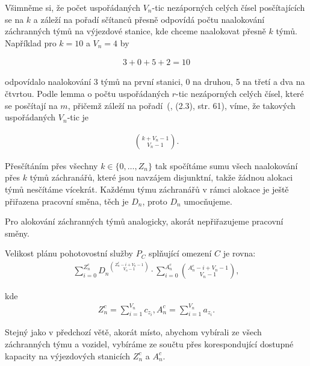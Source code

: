 \begin{dukaz}
  Všimněme si, že počet uspořádaných $V_n$-tic nezáporných celých čísel posčítajících se na $k$
  a záleží na pořadí sčítanců přesně odpovídá počtu naalokování záchranných týmů na výjezdové stanice, kde chceme naalokovat přesně $k$ týmů.
  Například pro $k = 10$ a $V_n = 4$ by

  \begin{align*}
    3 + 0 + 5 + 2 = 10
  \end{align*}

  odpovídalo naalokování 3 týmů na první stanici, 0 na druhou, 5 na třetí a dva na čtvrtou.
  Podle lemma o počtu uspořádaných $r$-tic nezáporných celých čísel, které se posčítají na $m$, přičemž záleží na pořadí~(\citet{Diskretka}, (2.3), str. 61),
  víme, že takových uspořádaných $V_n$-tic je

  \begin{align}
    \binom{k + V_n - 1}{V_n - 1}.
  \end{align}

  Přesčítáním přes všechny $k \in \{ 0, \dots, Z_n \}$ tak spočítáme sumu všech naalokování přes $k$ týmů záchranářů, které jsou navzájem disjunktní, takže žádnou alokaci týmů nesčítáme vícekrát.
  Každému týmu záchranářů v rámci alokace je ještě přiřazena pracovní směna, těch je $D_n$, proto $D_n$ umocňujeme. 

  Pro alokování záchranných týmů analogicky, akorát nepřiřazujeme pracovní směny.
\end{dukaz}

\begin{veta}
  Velikost plánu pohotovostní služby $P_C$ splňující omezení $C$ je rovna:
  \begin{align*}
    \sum_{i=0}^{Z^c_n}{{D_n}^{\binom{Z^c_n - i + V_n - 1}{V_n - 1}}} \cdot \sum_{i = 0}^{A^c_n}\binom{A^c_n - i + V_n - 1}{V_n - 1},
  \end{align*}

  kde
  \begin{align*}
    Z^c_n = \sum_{i=1}^{V_n} c_{z_{i}}, A^c_n = \sum_{i=1}^{V_n} a_{z_{i}}.
  \end{align*}
\end{veta}

\begin{dukaz}
  Stejný jako v předchozí větě, akorát místo, abychom vybírali ze všech záchranných týmu a vozidel,
  vybíráme ze součtu přes korespondující dostupné kapacity na výjezdových stanicích $Z^c_n$ a $A^c_n$.
\end{dukaz}


